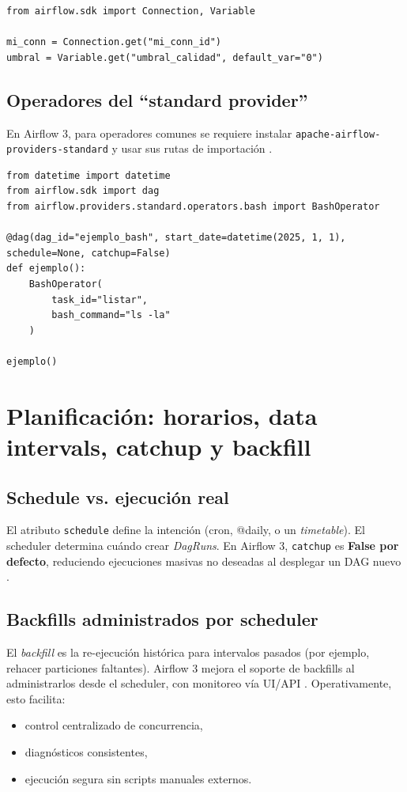 \begin{lstlisting}[style=python,caption={Acceso directo (SDK) a Connection/Variable}]
from airflow.sdk import Connection, Variable

mi_conn = Connection.get("mi_conn_id")
umbral = Variable.get("umbral_calidad", default_var="0")
\end{lstlisting}

\subsection{Operadores del ``standard provider''}
En Airflow 3, para operadores comunes se requiere instalar \texttt{apache-airflow-providers-standard} y usar sus rutas de importación \cite{airflow_upgrade_3_breaking,airflow_standard_provider_bash,airflow_standard_provider_python_api}.

\begin{lstlisting}[style=python,caption={Ejemplo de uso de BashOperator desde el provider estándar}]
from datetime import datetime
from airflow.sdk import dag
from airflow.providers.standard.operators.bash import BashOperator

@dag(dag_id="ejemplo_bash", start_date=datetime(2025, 1, 1), schedule=None, catchup=False)
def ejemplo():
    BashOperator(
        task_id="listar",
        bash_command="ls -la"
    )

ejemplo()
\end{lstlisting}

\section{Planificación: horarios, data intervals, catchup y backfill}
\subsection{Schedule vs. ejecución real}
El atributo \texttt{schedule} define la intención (cron, @daily, o un \textit{timetable}). El scheduler determina cuándo crear \textit{DagRuns}. En Airflow 3, \texttt{catchup} es \textbf{False por defecto}, reduciendo ejecuciones masivas no deseadas al desplegar un DAG nuevo \cite{airflow_upgrade_3_breaking}.

\subsection{Backfills administrados por scheduler}
El \textit{backfill} es la re-ejecución histórica para intervalos pasados (por ejemplo, rehacer particiones faltantes). Airflow 3 mejora el soporte de backfills al administrarlos desde el scheduler, con monitoreo vía UI/API \cite{airflow_blog_3_ga,airflow_release_notes_3}. Operativamente, esto facilita:
\begin{itemize}[leftmargin=*]
  \item control centralizado de concurrencia,
  \item diagnósticos consistentes,
  \item ejecución segura sin scripts manuales externos.
\end{itemize}

